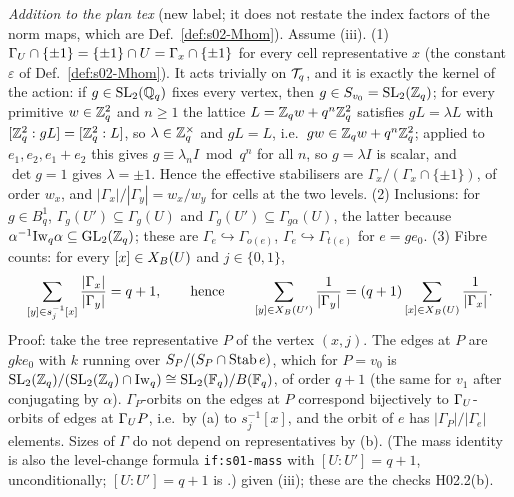 \begin{remark}\label{rem:s02-quot-index}
\emph{Addition to the plan tex} (new label; it does not restate the index factors of the norm maps, which are
Def.~\ref{def:s02-Mhom}). Assume (iii). (1) $\Gamma_U\cap\{\pm1\}=\{\pm1\}\cap U=\Gamma_x\cap\{\pm1\}$ for every cell representative $x$
(the constant $\varepsilon$ of Def.~\ref{def:s02-Mhom}). It acts trivially on $\mathcal{T}_q$, and it is exactly the kernel of the action: if $g\in\mathrm{SL}_2(\mathbb{Q}_q)$ fixes every
vertex, then $g\in S_{v_0}=\mathrm{SL}_2(\mathbb{Z}_q)$; for every primitive $w\in\mathbb{Z}_q^2$ and $n\ge1$ the lattice $L=\mathbb{Z}_q w+q^n\mathbb{Z}_q^2$ satisfies
$gL=\lambda L$ with $[\mathbb{Z}_q^2:gL]=[\mathbb{Z}_q^2:L]$, so $\lambda\in\mathbb{Z}_q^\times$ and $gL=L$, i.e.\ $gw\in\mathbb{Z}_q w+q^n\mathbb{Z}_q^2$; applied to
$e_1,e_2,e_1+e_2$ this gives $g\equiv\lambda_nI\bmod q^n$ for all $n$, so $g=\lambda I$ is scalar, and $\det g=1$ gives $\lambda=\pm1$. Hence the effective stabilisers are
$\Gamma_x/(\Gamma_x\cap\{\pm1\})$, of order $w_x$, and $|\Gamma_x|/|\Gamma_y|=w_x/w_y$ for cells at the two levels.
(2) Inclusions: for $g\in B^1_q$, $\Gamma_g(U')\subseteq\Gamma_g(U)$ and $\Gamma_g(U')\subseteq\Gamma_{g\alpha}(U)$, the latter because
$\alpha^{-1}\mathrm{Iw}_q\alpha\subseteq\mathrm{GL}_2(\mathbb{Z}_q)$; these are $\Gamma_e\hookrightarrow\Gamma_{o(e)}$, $\Gamma_e\hookrightarrow\Gamma_{t(e)}$ for $e=ge_0$.
(3) Fibre counts: for every $[x]\in X_B(U)$ and $j\in\{0,1\}$,
\[\sum_{[y]\in s_j^{-1}[x]}\frac{|\Gamma_x|}{|\Gamma_y|}=q+1,\qquad\text{hence}\qquad\sum_{[y]\in X_B(U')}\frac1{|\Gamma_y|}=(q+1)\sum_{[x]\in X_B(U)}\frac1{|\Gamma_x|}.\]
Proof: take the tree representative $P$ of the vertex $(x,j)$. The edges at $P$ are $gke_0$ with $k$ running over
$S_P/(S_P\cap\operatorname{Stab} e)$, which for $P=v_0$ is $\mathrm{SL}_2(\mathbb{Z}_q)/(\mathrm{SL}_2(\mathbb{Z}_q)\cap\mathrm{Iw}_q)\cong\mathrm{SL}_2(\mathbb{F}_q)/B(\mathbb{F}_q)$, of order $q+1$ (the same for
$v_1$ after conjugating by $\alpha$). $\Gamma_P$-orbits on the edges at $P$ correspond bijectively to $\Gamma_U$-orbits of edges at $\Gamma_U P$,
i.e.\ by (a) to $s_j^{-1}[x]$, and the orbit of $e$ has $|\Gamma_P|/|\Gamma_e|$ elements. Sizes of $\Gamma$ do not depend on representatives by
(b). (The mass identity is also the level-change formula \texttt{if:s01-mass} with $[U:U']=q+1$, unconditionally;
$[U:U']=q+1$ is .) \stproved{}
given (iii); these are the checks H02.2(b).
\end{remark}


